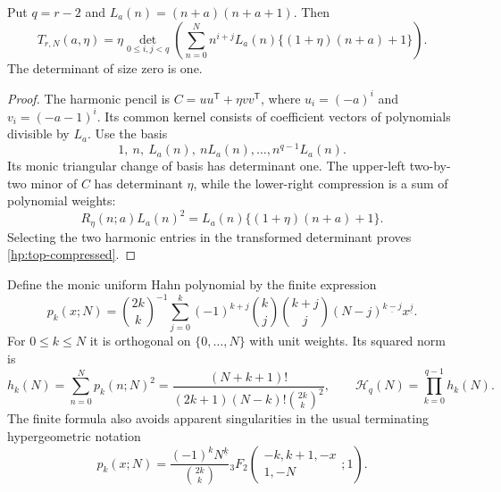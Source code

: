 \begin{proposition}
\label{hp:compression}
Put $q=r-2$ and $L_a(n)=(n+a)(n+a+1)$. Then
\begin{equation}\label{hp:top-compressed}
 \boxed{\displaystyle
 T_{r,N}(a,\eta)=\eta
 \det_{0\le i,j<q}\left(
 \sum_{n=0}^N n^{i+j}L_a(n)
                   \{(1+\eta)(n+a)+1\}\right).}
\end{equation}
The determinant of size zero is one.
\end{proposition}
\begin{proof}
The harmonic pencil is $C=uu^{\mathsf T}+\eta vv^{\mathsf T}$,
where $u_i=(-a)^i$ and $v_i=(-a-1)^i$. Its common kernel consists
of coefficient vectors of polynomials divisible by $L_a$. Use the
basis
\[
 1,\ n,\ L_a(n),\ nL_a(n),\ldots,n^{q-1}L_a(n).
\]
Its monic triangular change of basis has determinant one. The
upper-left two-by-two minor of $C$ has determinant $\eta$, while
the lower-right compression is a sum of polynomial weights:
\[
 R_\eta(n;a)L_a(n)^2
   =L_a(n)\{(1+\eta)(n+a)+1\}.
\]
Selecting the two harmonic entries in the transformed determinant
proves \eqref{hp:top-compressed}.
\end{proof}

Define the monic uniform Hahn polynomial by the finite expression
\begin{equation}\label{hp:hahn}
 p_k(x;N)=\binom{2k}{k}^{-1}
 \sum_{j=0}^k(-1)^{k+j}\binom kj\binom{k+j}{j}
                  (N-j)^{\underline{k-j}}x^{\underline j}.
\end{equation}
For $0\le k\le N$ it is orthogonal on $\{0,\ldots,N\}$ with
unit weights. Its squared norm is
\begin{equation}\label{hp:norm}
 h_k(N)=\sum_{n=0}^Np_k(n;N)^2
   =\frac{(N+k+1)!}{(2k+1)(N-k)!\binom{2k}{k}^2},
 \qquad \mathcal H_q(N)=\prod_{k=0}^{q-1}h_k(N).
\end{equation}
The finite formula also avoids apparent singularities in the
usual terminating hypergeometric notation
\[
 p_k(x;N)=
 \frac{(-1)^kN^{\underline k}}{\binom{2k}{k}}
 {}_3F_2\!\left(\begin{matrix}-k,k+1,-x\\1,-N\end{matrix};1\right).
\]

